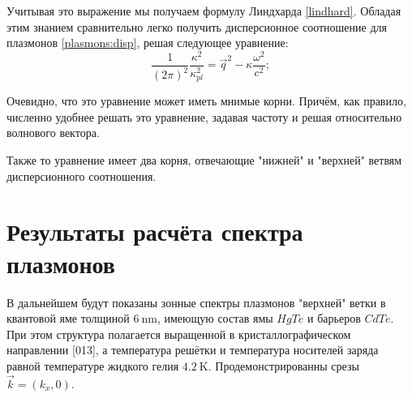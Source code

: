 \documentclass[../main.tex]{subfiles}
\begin{document}
    Учитывая это выражение мы получаем формулу Линдхарда \ref{lindhard}. Обладая 
    этим знанием сравнительно легко получить дисперсионное соотношение для плазмонов
    \ref{plasmons:disp}, решая следующее уравнение:
    \begin{equation}
        \label{plasmons:disp}
        \frac{1}{(2\pi)^2}\frac{\kappa^2}{\kappa^2_{pl}} = 
        \vec{q}^2 - \kappa \frac{\omega^2}{c^2};
    \end{equation}
    
    Очевидно, что это уравнение может иметь мнимые корни. Причём, как правило,
    численно удобнее решать это уравнение, задавая частоту и решая относительно 
    волнового вектора.

    Также то уравнение имеет два корня, отвечающие "нижней" и "верхней" ветвям 
    дисперсионного соотношения.

    \section{Результаты расчёта спектра плазмонов}

    В дальнейшем будут показаны зонные спектры плазмонов "верхней" ветки в 
    квантовой яме толщиной $6~\text{nm}$, имеющую состав ямы $HgTe$ и 
    барьеров $CdTe$. При этом структура полагается выращенной в кристаллографическом
    направлении [013], а температура решётки и температура носителей заряда равной 
    температуре жидкого гелия $4.2~\text{K}$. Продемонстрированны срезы 
    $\vec k = (k_x, 0)$.
\end{document}
